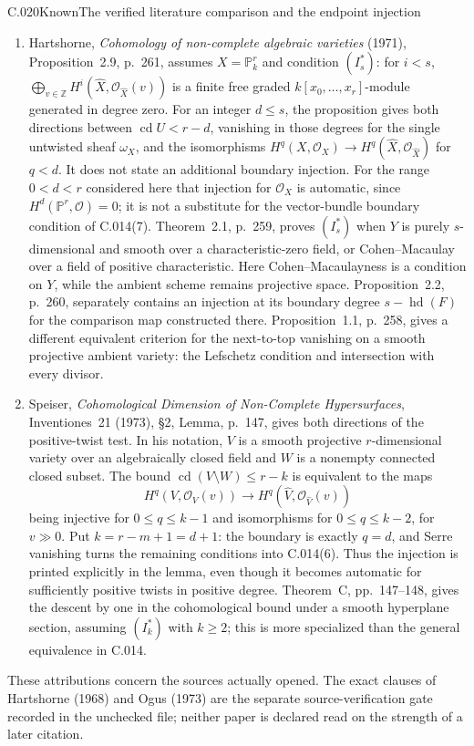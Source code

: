 \begin{saresult}{C.020}{Known}{The verified literature comparison and the endpoint injection}
\begin{enumerate}
\item Hartshorne, \emph{Cohomology of non-complete algebraic
varieties} (1971), Proposition~2.9, p.~261, assumes
$X=\mathbb P^r_k$ and condition $(I_s^*)$: for $i<s$,
$\bigoplus_{v\in\mathbb Z}H^i(\widehat X,
\mathcal O_{\widehat X}(v))$ is a finite free graded
$k[x_0,\ldots,x_r]$-module generated in degree zero.
For an integer $d\leq s$, the proposition gives both directions
between $\operatorname{cd}U<r-d$, vanishing in those degrees
for the single untwisted sheaf $\omega_X$, and the
isomorphisms
$H^q(X,\mathcal O_X)\to H^q(\widehat X,
\mathcal O_{\widehat X})$ for $q<d$.
It does not state an additional boundary injection. For the
range $0<d<r$ considered here that injection for
$\mathcal O_X$ is automatic, since $H^d(\mathbb P^r,
\mathcal O)=0$; it is not a substitute for the vector-bundle
boundary condition of C.014(7).
Theorem~2.1, p.~259, proves $(I_s^*)$ when $Y$ is purely
$s$-dimensional and smooth over a characteristic-zero field,
or Cohen--Macaulay over a field of positive characteristic.
Here Cohen--Macaulayness is a condition on $Y$, while the
ambient scheme remains projective space.
Proposition~2.2, p.~260, separately contains an injection
at its boundary degree $s-\operatorname{hd}(F)$ for the
comparison map constructed there. Proposition~1.1, p.~258,
gives a different equivalent criterion for the next-to-top
vanishing on a smooth projective ambient variety: the
Lefschetz condition and intersection with every divisor.

\item Speiser, \emph{Cohomological Dimension of Non-Complete
Hypersurfaces}, Inventiones~21 (1973), \S2, Lemma, p.~147,
gives both directions of the positive-twist test. In his
notation, $V$ is a smooth projective $r$-dimensional variety
over an algebraically closed field and $W$ is a nonempty
connected closed subset. The bound
$\operatorname{cd}(V\setminus W)\leq r-k$ is equivalent to
the maps
\[
 H^q(V,\mathcal O_V(v))\longrightarrow
 H^q(\widehat V,\mathcal O_{\widehat V}(v))
\]
being injective for $0\leq q\leq k-1$ and isomorphisms
for $0\leq q\leq k-2$, for $v\gg0$.
Put $k=r-m+1=d+1$: the boundary is exactly $q=d$,
and Serre vanishing turns the remaining conditions into
C.014(6). Thus the injection is printed explicitly in
the lemma, even though it becomes automatic for sufficiently
positive twists in positive degree.
Theorem~C, pp.~147--148, gives the descent by one in the
cohomological bound under a smooth hyperplane section,
assuming $(I_k^*)$ with $k\geq2$; this is more specialized
than the general equivalence in C.014.
\end{enumerate}
These attributions concern the sources actually opened. The exact
clauses of Hartshorne (1968) and Ogus (1973) are the separate
source-verification gate recorded in the unchecked file; neither
paper is declared read on the strength of a later citation.
\end{saresult}
